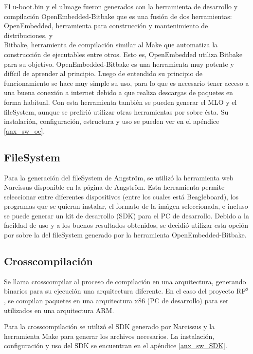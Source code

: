 El u-boot.bin y el uImage fueron generados con la herramienta de desarrollo y compilación OpenEmbedded-Bitbake \cite{OE-Bb} que es una fusión de dos herramientas: OpenEmbedded, herramienta para construcción y mantenimiento de distribuciones, y \\
Bitbake, herramienta de compilación similar al Make \cite{Make} que automatiza la construcción de ejecutables entre otros. Esto es, OpenEmbedded utiliza Bitbake para su objetivo. OpenEmbedded-Bitbake es una herramienta muy potente y difícil de aprender al principio. Luego de entendido su principio de funcionamiento se hace muy simple su uso, para lo que es necesario tener acceso a una buena conexión a internet debido a que realiza descargas de paquetes en forma habitual.
Con esta herramienta también se pueden generar el MLO y el fileSystem, aunque se prefirió utilizar otras herramientas por sobre ésta. 
Su instalación, configuración, estructura y uso se pueden ver en el apéndice \ref{anx_sw_oe}.

\subsection{FileSystem}
Para la generación del fileSystem de Angström, se utilizó la herramienta web \\
Narcissus \cite{Narc} disponible en la página de Angström.
Esta herramienta permite seleccionar entre diferentes dispositivos (entre los cuales está Beagleboard), los programas que se quieran instalar, el formato de la imágen seleccionada, e incluso se puede generar un kit de desarrollo (SDK) para el PC de desarrollo. Debido a la facildad de uso y a los buenos resultados obtenidos, se decidió utilizar esta opción por sobre la del fileSystem generado por la herramienta OpenEmbedded-Bitbake.

\subsection{Crosscompilación}
Se llama crosscompilar al proceso de compilación en una arquitectura, generando binarios para su ejecución una arquitectura diferente. En el caso del proyecto RF$^{2}$, se compilan paquetes en una arquitectura x86 (PC de desarrollo) para ser utilizados en una arquitectura ARM.


Para la crosscompilación se utilizó el SDK generado por Narcissus y la herramienta Make para generar los archivos necesarios. La instalación, configuración y uso del SDK se encuentran en el apéndice \ref{anx_sw_SDK}.

